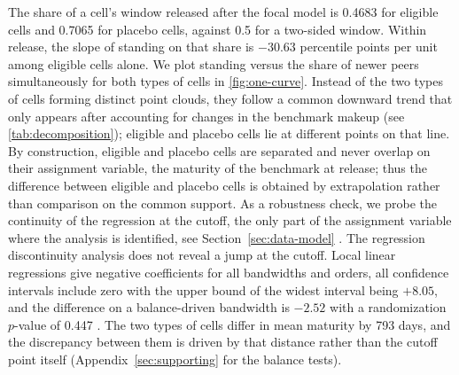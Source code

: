 \documentclass{article}
\begin{document}
The share of a cell's window released after the focal model is 0.4683 for eligible cells and 0.7065 for placebo cells, against 0.5 for a two-sided window. Within release, the slope of standing on that share is $-30.63$ percentile points per unit among eligible cells alone. We plot standing versus the share of newer peers simultaneously for both types of cells in \autoref{fig:one-curve}. Instead of the two types of cells forming distinct point clouds, they follow a common downward trend that only appears after accounting for changes in the benchmark makeup (see \autoref{tab:decomposition}); eligible and placebo cells lie at different points on that line. By construction, eligible and placebo cells are separated and never overlap on their assignment variable, the maturity of the benchmark at release; thus the difference between eligible and placebo cells is obtained by extrapolation rather than comparison on the common support. As a robustness check, we probe the continuity of the regression at the cutoff, the only part of the assignment variable where the analysis is identified, see Section~\ref{sec:data-model} \citep{hahn2001identification}. The regression discontinuity analysis does not reveal a jump at the cutoff. Local linear regressions give negative coefficients for all bandwidths and orders, all confidence intervals include zero with the upper bound of the widest interval being $+8.05$, and the difference on a balance-driven bandwidth is $-2.52$ with a randomization $p$-value of 0.447 \citep{cattaneo2015randomization}. The two types of cells differ in mean maturity by 793 days, and the discrepancy between them is driven by that distance rather than the cutoff point itself (Appendix~\ref{sec:supporting} for the balance tests).
\end{document}
